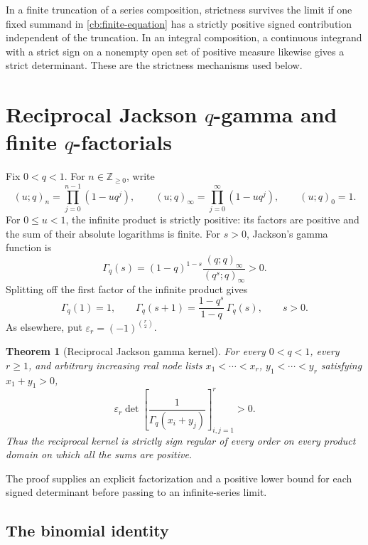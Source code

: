 \documentclass[11pt,a4paper]{article}
\newtheorem{theorem}{Theorem}[section]
\theoremstyle{definition}
\theoremstyle{remark}
\newcommand{\ep}{\varepsilon}
\begin{document}
In a finite truncation of a series composition, strictness survives the
limit if one fixed summand in \eqref{cb:finite-equation} has a strictly
positive signed contribution independent of the truncation. In an
integral composition, a continuous integrand with a strict sign on a
nonempty open set of positive measure likewise gives a strict
determinant. These are the strictness mechanisms used below.

\section{Reciprocal Jackson \texorpdfstring{$q$}{q}-gamma and finite
\texorpdfstring{$q$}{q}-factorials}\label{qg:section}

Fix \(0<q<1\). For \(n\in\mathbb Z_{\ge0}\), write
\[
 (u;q)_n=\prod_{j=0}^{n-1}(1-uq^j),\qquad
 (u;q)_\infty=\prod_{j=0}^{\infty}(1-uq^j),
 \qquad (u;q)_0=1.
\]
For \(0\le u<1\), the infinite product is strictly positive: its
factors are positive and the sum of their absolute logarithms is finite.
For \(s>0\), Jackson's gamma function is
\begin{equation}\label{qg:definition}
 \Gamma_q(s)=(1-q)^{1-s}
 \frac{(q;q)_\infty}{(q^s;q)_\infty}>0.
\end{equation}
Splitting off the first factor of the infinite product gives
\begin{equation}\label{qg:recurrence}
 \Gamma_q(1)=1,\qquad
 \Gamma_q(s+1)=\frac{1-q^s}{1-q}\,\Gamma_q(s),\qquad s>0.
\end{equation}
As elsewhere, put \(\ep_r=(-1)^{\binom r2}\).

\begin{theorem}[Reciprocal Jackson gamma kernel]\label{qg:main}
For every \(0<q<1\), every \(r\ge1\), and arbitrary increasing
real node lists \(x_1<\cdots<x_r\), \(y_1<\cdots<y_r\)
satisfying \(x_1+y_1>0\),
\begin{equation}\label{qg:main-sign}
 \ep_r\det\left[\frac{1}{\Gamma_q(x_i+y_j)}\right]_{i,j=1}^r>0.
\end{equation}
Thus the reciprocal kernel is strictly sign regular of every order on
every product domain on which all the sums are positive.
\end{theorem}

The proof supplies an explicit factorization and a positive lower
bound for each signed determinant before passing to an infinite-series
limit.

\subsection{The binomial identity}
\end{document}
